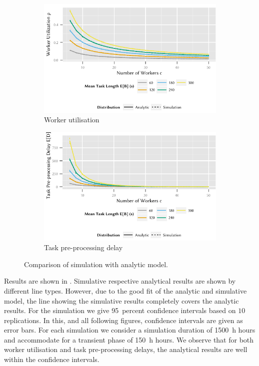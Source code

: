 \begin{figure}
	\centering
	\begin{subfigure}{\columnwidth}
		\includegraphics{cloud/crowdsourcing/model/figures/comparison_utilization}
		\caption{Worker utilisation}
		\label{fig:cloud:crowdsourcing:validation:model:utilization}
	\end{subfigure}

	\begin{subfigure}{\columnwidth}
		\includegraphics{cloud/crowdsourcing/model/figures/comparison_task_delay}
		\caption{Task pre-processing delay}
		\label{fig:cloud:crowdsourcing:validation:model:task_delay}
	\end{subfigure}
	\caption{Comparison of simulation with analytic model.}
	\label{fig:cloud:crowdsourcing:validation:model}
\end{figure}

Results are shown in .
Simulative respective analytical results are shown by different line types.
However, due to the good fit of the analytic and simulative model, the line showing the simulative results completely covers the analytic results.
For the simulation we give \SI{95}{percent} confidence intervals based on \(10\) replications.
In this, and all following figures, confidence intervals are given as error bars.
For each simulation we consider a simulation duration of \SI{1500}{\hour} hours and accommodate for a transient phase of \SI{150}{\hour} hours.
We observe that for both worker utilisation and task pre-processing delays, the analytical results are well within the confidence intervals.